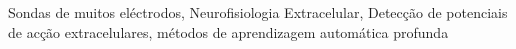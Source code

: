 \begin{palavraschave}
Sondas de muitos eléctrodos, Neurofisiologia Extracelular, Detecção de potenciais de acção extracelulares, métodos de aprendizagem automática profunda
\end{palavraschave}
\clearpage
\thispagestyle{empty}
\cleardoublepage
